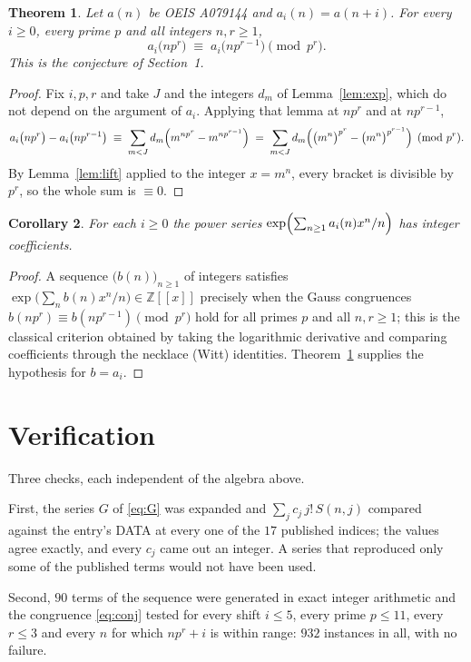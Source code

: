 \documentclass[11pt,a4paper]{article}
\theoremstyle{plain}
\newtheorem{theorem}{Theorem}
\newtheorem{corollary}[theorem]{Corollary}
\theoremstyle{definition}
\begin{document}
\begin{theorem}\label{thm:main}
Let $a(n)$ be OEIS A079144 and $a_i(n)=a(n+i)$. For every $i\ge0$, every prime $p$ and all
integers $n,r\ge1$,
\[
a_i\bigl(np^{r}\bigr)\;\equiv\;a_i\bigl(np^{r-1}\bigr)\pmod{p^{r}} .
\]
This is the conjecture of Section~1.
\end{theorem}

\begin{proof}
Fix $i,p,r$ and take $J$ and the integers $d_m$ of Lemma~\ref{lem:exp}, which do not
depend on the argument of $a_i$. Applying that lemma at $np^{r}$ and at $np^{r-1}$,
\[
a_i\bigl(np^{r}\bigr)-a_i\bigl(np^{r-1}\bigr)
\;\equiv\;\sum_{m<J} d_m\Bigl(m^{np^{r}}-m^{np^{r-1}}\Bigr)
\;=\;\sum_{m<J} d_m\Bigl(\bigl(m^{n}\bigr)^{p^{r}}-\bigl(m^{n}\bigr)^{p^{r-1}}\Bigr)
\pmod{p^{r}} .
\]
By Lemma~\ref{lem:lift} applied to the integer $x=m^{n}$, every bracket is divisible by
$p^{r}$, so the whole sum is $\equiv 0$.
\end{proof}

\begin{corollary}
For each $i\ge0$ the power series $\exp\Bigl(\sum_{n\ge1}a_i(n)x^{n}/n\Bigr)$ has integer
coefficients.
\end{corollary}

\begin{proof}
A sequence $\bigl(b(n)\bigr)_{n\ge1}$ of integers satisfies
$\exp\bigl(\sum_n b(n)x^{n}/n\bigr)\in\mathbb{Z}[[x]]$ precisely when the Gauss congruences
$b(np^{r})\equiv b(np^{r-1})\pmod{p^{r}}$ hold for all primes $p$ and all $n,r\ge1$;
this is the classical criterion obtained by taking the logarithmic derivative and
comparing coefficients through the necklace (Witt) identities. Theorem~\ref{thm:main}
supplies the hypothesis for $b=a_i$.
\end{proof}

\section{Verification}

Three checks, each independent of the algebra above.

First, the series $G$ of \eqref{eq:G} was expanded and $\sum_j c_j\,j!\,S(n,j)$ compared
against the entry's DATA at every one of the $17$ published indices; the values
agree exactly, and every $c_j$ came out an integer. A series that reproduced only some of
the published terms would not have been used.

Second, $90$ terms of the sequence were generated in exact integer arithmetic and the
congruence \eqref{eq:conj} tested for every shift $i\le5$, every prime $p\le11$, every
$r\le3$ and every $n$ for which $np^{r}+i$ is within range: $932$ instances in all,
with no failure.
\end{document}
